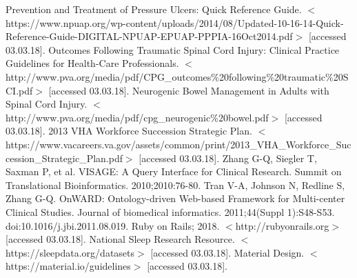 \documentclass{amia}
\begin{document}
{\begin{thebibliography}{1}
Prevention and Treatment of Pressure Ulcers: Quick Reference Guide. $<$https://www.npuap.org/wp-content/uploads/2014/08/Updated-10-16-14-Quick-Reference-Guide-DIGITAL-NPUAP-EPUAP-PPPIA-16Oct2014.pdf$>$ [accessed 03.03.18].
Outcomes Following Traumatic Spinal Cord Injury: Clinical Practice Guidelines for Health-Care Professionals. $<$http://www.pva.org/media/pdf/CPG\_outcomes\%20following\%20traumatic\%20SCI.pdf$>$ [accessed 03.03.18].
Neurogenic Bowel Management in Adults with Spinal Cord Injury. $<$http://www.pva.org/media/pdf/cpg\_neurogenic\%20bowel.pdf$>$ [accessed 03.03.18].
2013 VHA Workforce Succession Strategic Plan. $<$https://www.vacareers.va.gov/assets/common/print/2013\_VHA\_Workforce\_Succession\_Strategic\_Plan.pdf$>$ [accessed 03.03.18].
Zhang G-Q, Siegler T, Saxman P, et al. VISAGE: A Query Interface for Clinical Research. Summit on Translational Bioinformatics. 2010;2010:76-80.
Tran V-A, Johnson N, Redline S, Zhang G-Q. OnWARD: Ontology-driven Web-based Framework for Multi-center Clinical Studies. Journal of biomedical informatics. 2011;44(Suppl 1):S48-S53. doi:10.1016/j.jbi.2011.08.019.
Ruby on Rails; 2018. $<$http://rubyonrails.org$>$ [accessed 03.03.18].
National Sleep Research Resource. $<$https://sleepdata.org/datasets$>$ [accessed 03.03.18].
Material Design. $<$https://material.io/guidelines$>$ [accessed 03.03.18].

\end{thebibliography}
}
\end{document}
